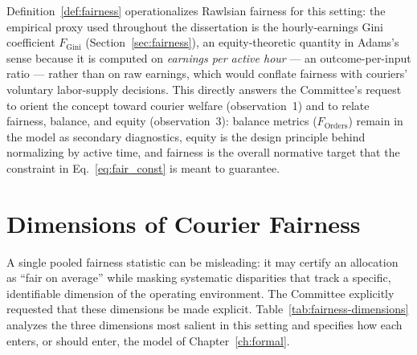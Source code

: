 \documentclass[12pt,a4paper]{report}
\begin{document}
Definition~\ref{def:fairness} operationalizes Rawlsian fairness for this setting: the empirical proxy used throughout the dissertation is the hourly-earnings Gini coefficient $F_{\text{Gini}}$ (Section~\ref{sec:fairness}), an equity-theoretic quantity in Adams's sense because it is computed on \emph{earnings per active hour} --- an outcome-per-input ratio --- rather than on raw earnings, which would conflate fairness with couriers' voluntary labor-supply decisions. This directly answers the Committee's request to orient the concept toward courier welfare (observation~1) and to relate fairness, balance, and equity (observation~3): balance metrics ($F_{\text{Orders}}$) remain in the model as secondary diagnostics, equity is the design principle behind normalizing by active time, and fairness is the overall normative target that the constraint in Eq.~\eqref{eq:fair_const} is meant to guarantee.

\section{Dimensions of Courier Fairness}
\label{sec:concept-dimensions}

A single pooled fairness statistic can be misleading: it may certify an allocation as ``fair on average'' while masking systematic disparities that track a specific, identifiable dimension of the operating environment. The Committee explicitly requested that these dimensions be made explicit. Table~\ref{tab:fairness-dimensions} analyzes the three dimensions most salient in this setting and specifies how each enters, or should enter, the model of Chapter~\ref{ch:formal}.
\end{document}
